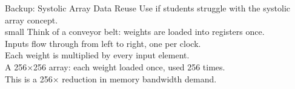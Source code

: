 \documentclass[aspectratio=169, 12pt]{beamer}
\begin{document}
\begin{frame}{Backup: Systolic Array Data Reuse}
\small
Use if students struggle with the systolic array concept.\\small Think of a conveyor belt: weights are loaded into registers once.\\ Inputs flow through from left to right, one per clock.\\ Each weight is multiplied by every input element.\\ A 256$\times$256 array: each weight loaded once, used 256 times.\\ This is a 256$\times$ reduction in memory bandwidth demand.
\end{frame}
\end{document}
